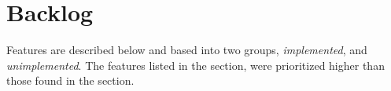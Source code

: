\chapter{Backlog}
\label{chap:backlog}

Features are described below and based into two groups, \emph{implemented}, and \emph{unimplemented}.
The features listed in the  section, were prioritized higher than those found in the  section. 




